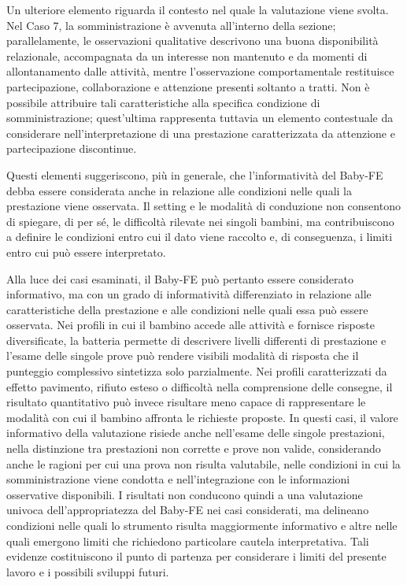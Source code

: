 Un ulteriore elemento riguarda il contesto nel quale la valutazione viene svolta. Nel Caso 7, la somministrazione è avvenuta all'interno della sezione; parallelamente, le osservazioni qualitative descrivono una buona disponibilità relazionale, accompagnata da un interesse non mantenuto e da momenti di allontanamento dalle attività, mentre l'osservazione comportamentale restituisce partecipazione, collaborazione e attenzione presenti soltanto a tratti. Non è possibile attribuire tali caratteristiche alla specifica condizione di somministrazione; quest'ultima rappresenta tuttavia un elemento contestuale da considerare nell'interpretazione di una prestazione caratterizzata da attenzione e partecipazione discontinue.

Questi elementi suggeriscono, più in generale, che l'informatività del Baby-FE debba essere considerata anche in relazione alle condizioni nelle quali la prestazione viene osservata. Il setting e le modalità di conduzione non consentono di spiegare, di per sé, le difficoltà rilevate nei singoli bambini, ma contribuiscono a definire le condizioni entro cui il dato viene raccolto e, di conseguenza, i limiti entro cui può essere interpretato.

Alla luce dei casi esaminati, il Baby-FE può pertanto essere considerato informativo, ma con un grado di informatività differenziato in relazione alle caratteristiche della prestazione e alle condizioni nelle quali essa può essere osservata. Nei profili in cui il bambino accede alle attività e fornisce risposte diversificate, la batteria permette di descrivere livelli differenti di prestazione e l'esame delle singole prove può rendere visibili modalità di risposta che il punteggio complessivo sintetizza solo parzialmente. Nei profili caratterizzati da effetto pavimento, rifiuto esteso o difficoltà nella comprensione delle consegne, il risultato quantitativo può invece risultare meno capace di rappresentare le modalità con cui il bambino affronta le richieste proposte. In questi casi, il valore informativo della valutazione risiede anche nell'esame delle singole prestazioni, nella distinzione tra prestazioni non corrette e prove non valide, considerando anche le ragioni per cui una prova non risulta valutabile, nelle condizioni in cui la somministrazione viene condotta e nell'integrazione con le informazioni osservative disponibili. I risultati non conducono quindi a una valutazione univoca dell'appropriatezza del Baby-FE nei casi considerati, ma delineano condizioni nelle quali lo strumento risulta maggiormente informativo e altre nelle quali emergono limiti che richiedono particolare cautela interpretativa. Tali evidenze costituiscono il punto di partenza per considerare i limiti del presente lavoro e i possibili sviluppi futuri.

